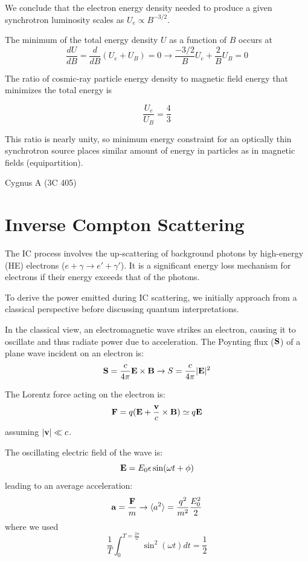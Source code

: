 We conclude that the electron energy density needed to produce a given synchrotron luminosity scales as $U_e \propto B^{-3/2}$. %

The minimum of the total energy density $U$ as a function of $B$ occurs at
%
\begin{equation*}
\frac{dU}{dB} = \frac{d}{dB} (U_e + U_B) = 0 \rightarrow \frac{-3/2}{B} U_e + \frac{2}{B} U_B = 0
\end{equation*}

The ratio of cosmic-ray particle energy density to magnetic field energy that minimizes the total energy is
%
\begin{remark}
\[
\frac{U_e}{U_B} = \frac{4}{3}
\]
\end{remark}

This ratio is nearly unity, so minimum energy constraint for an optically thin synchrotron source places similar amount of energy in particles as in magnetic fields (equipartition).

\begin{problem}
Cygnus A (3C 405)
\end{problem}


\section{Inverse Compton Scattering}

The IC process involves the up-scattering of background photons by high-energy (HE) electrons (\(e + \gamma \rightarrow e' + \gamma'\)). It is a significant energy loss mechanism for electrons if their energy exceeds that of the photons.

To derive the power emitted during IC scattering, we initially approach from a classical perspective before discussing quantum interpretations.

In the classical view, an electromagnetic wave strikes an electron, causing it to oscillate and thus radiate power due to acceleration. The Poynting flux (\( \vb S \)) of a plane wave incident on an electron is:
%
\[
\vb S =  \frac{c}{4\pi} \vb E \times \vb B \rightarrow S = \frac{c}{4\pi} | \vb E |^2   
\]

The Lorentz force acting on the electron is:
%
\[
\vb F = q (\vb E + \frac{\vb v}{c} \times \vb B) \simeq q \vb E
\]
%
assuming \( | \vb v | \ll c \).

The oscillating electric field of the wave is:
%
\[
\vb E = E_0 \vb \epsilon \sin (\omega t + \phi)
\]
%
leading to an average acceleration:
%
\[
\vb a = \frac{\vb F}{m} \rightarrow \langle a^2 \rangle = \frac{q^2}{m^2} \frac{E_0^2}{2}
\]
%
where we used
%
\[
\frac{1}{T} \int_0^{T = \frac{2\pi}{\omega}} \sin^2 (\omega t) dt = \frac{1}{2}
\]

